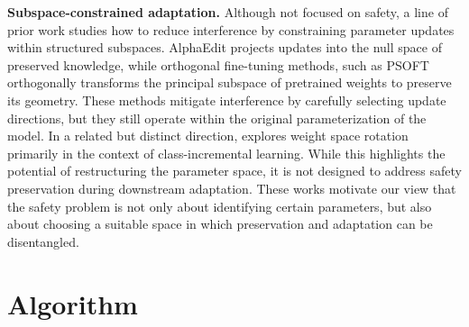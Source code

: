 \documentclass{article}
\begin{document}
\textbf{Subspace-constrained adaptation.} Although not focused on safety, a line of prior work studies how to reduce interference by constraining parameter updates within structured subspaces. AlphaEdit \citep{alphaedit} projects updates into the null space of preserved knowledge, while orthogonal fine-tuning methods, such as PSOFT \citep{psoft} orthogonally transforms the principal subspace of pretrained weights to preserve its geometry. These methods mitigate interference by carefully selecting update directions, but they still operate within the original parameterization of the model.  In a related but distinct direction, \citep{warp} explores weight space rotation primarily in the context of class-incremental learning. While this highlights the potential of restructuring the parameter space, it is not designed to address safety preservation during downstream adaptation. These works motivate our view that the safety problem is not only about identifying certain parameters, but also about choosing a suitable space in which preservation and adaptation can be disentangled.





\vspace{-1mm}


\section{Algorithm}
\label{sec:algorithm}

\vspace{-1mm}
\end{document}
